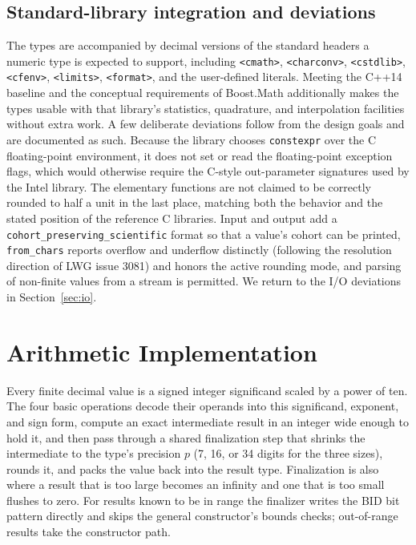 \documentclass[acmsmall]{acmart}
\begin{document}
\subsection{Standard-library integration and deviations}
The types are accompanied by decimal versions of the standard headers a numeric type is
expected to support, including \texttt{<cmath>}, \texttt{<charconv>},
\texttt{<cstdlib>}, \texttt{<cfenv>}, \texttt{<limits>}, \texttt{<format>}, and the
user-defined literals. Meeting the C++14 baseline and the conceptual requirements of
Boost.Math additionally makes the types usable with that library's statistics,
quadrature, and interpolation facilities without extra work. A few deliberate deviations
follow from the design goals and are documented as such. Because the library chooses
\texttt{constexpr} over the C floating-point environment, it does not set or read the
floating-point exception flags, which would otherwise require the C-style out-parameter
signatures used by the Intel library. The elementary functions are not claimed to be
correctly rounded to half a unit in the last place, matching both the behavior and the
stated position of the reference C libraries. Input and output add a
\texttt{cohort\_preserving\_scientific} format so that a value's cohort can be printed,
\texttt{from\_chars} reports overflow and underflow distinctly (following the resolution
direction of LWG issue 3081) and honors the active rounding mode, and parsing of
non-finite values from a stream is permitted. We return to the I/O deviations in
Section~\ref{sec:io}.

\section{Arithmetic Implementation}
\label{sec:impl}

Every finite decimal value is a signed integer significand scaled by a power of ten.
The four basic operations decode their operands into this significand, exponent, and
sign form, compute an exact intermediate result in an integer wide enough to hold it,
and then pass through a shared finalization step that shrinks the intermediate to the
type's precision $p$ (7, 16, or 34 digits for the three sizes), rounds it, and packs the
value back into the result type. Finalization is also where a result that is too large
becomes an infinity and one that is too small flushes to zero. For results known to be
in range the finalizer writes the BID bit pattern directly and skips the general
constructor's bounds checks; out-of-range results take the constructor path.
\end{document}
